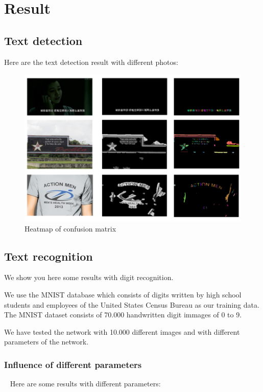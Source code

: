 \documentclass[paper=a4, french, 11pt]{scrartcl}
\begin{document}
\section{Result}

\subsection{Text detection}
Here are the text detection result with different photos:

\begin{figure}[h]
\begin{center}
   \includegraphics[width=1.0\linewidth]{results.png}
\end{center}
\vspace{-3ex}
\caption{Heatmap of confusion matrix}
\label{fig:heatmap}
\end{figure}

\subsection{Text recognition}
We show you here some results with digit recognition.

We use the MNIST database which consists of digits written by high school students and employees of the United States Census Bureau as our training data. The MNIST dataset consists of 70.000 handwritten digit immages of 0 to 9.

We have tested the network with 10.000 different images and with different parameters of the network.

\subsubsection{Influence of different parameters}
~\indent
Here are some results with different parameters:
\end{document}
